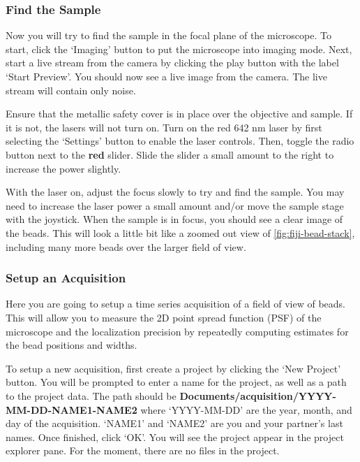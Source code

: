 \documentclass[10pt,a4paper,oneside]{book}
\begin{document}
\subsubsection{Find the Sample}

\newline

Now you will try to find the sample in the focal plane of the microscope. To start, click the `Imaging' button to put the microscope into imaging mode. Next, start a live stream from the camera by clicking the play button with the label `Start Preview'. You should now see a live image from the camera. The live stream will contain only noise.

Ensure that the metallic safety cover is in place over the objective and sample. If it is not, the lasers will not turn on. Turn on the red 642 nm laser by first selecting the `Settings' button to enable the laser controls. Then, toggle the radio button next to the \textbf{red} slider. Slide the slider a small amount to the right to increase the power slightly.

With the laser on, adjust the focus slowly to try and find the sample. You may need to increase the laser power a small amount and/or move the sample stage with the joystick. When the sample is in focus, you should see a clear image of the beads. This will look a little bit like a zoomed out view of \autoref{fig:fiji-bead-stack}, including many more beads over the larger field of view.

\subsubsection{Setup an Acquisition}

Here you are going to setup a time series acquisition of a field of view of beads. This will allow you to measure the 2D point spread function (PSF) of the microscope and the localization precision by repeatedly computing estimates for the bead positions and widths.

To setup a new acquisition, first create a project by clicking the `New Project' button. You will be prompted to enter a name for the project, as well as a path to the project data. The path should be \textbf{Documents/acquisition/YYYY-MM-DD-NAME1-NAME2} where `YYYY-MM-DD' are the year, month, and day of the acquisition. `NAME1' and `NAME2' are you and your partner's last names. Once finished, click `OK'. You will see the project appear in the project explorer pane. For the moment, there are no files in the project.
\end{document}

